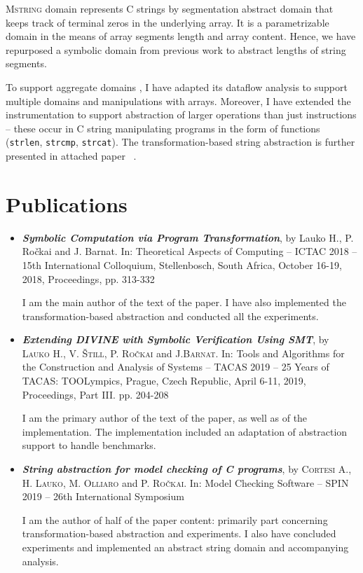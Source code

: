 \textsc{Mstring} domain represents C strings by segmentation abstract domain
that keeps track of terminal zeros in the underlying array. It is a
parametrizable domain in the means of array segments length and array
content.  Hence, we have repurposed a symbolic domain from previous work to
abstract lengths of string segments.

To support aggregate domains \lart, I have adapted its data\-flow analysis to
support multiple domains and manipulations with \llvm arrays. Moreover, I have
extended the instrumentation to support abstraction of larger operations than
just \llvm instructions -- these occur in C string manipulating programs in the
form of functions (\texttt{strlen}, \texttt{strcmp}, \texttt{strcat}). The
transformation-based string abstraction is further presented in attached paper
~\cite{Lauko2019String}.

\section{Publications}
\label{sec:publications}

\begin{itemize}

\item \textbf{\emph{Symbolic Computation via Program Transformation}}, by Lauko
H., P. Ročkai and J. Barnat.  In: Theoretical Aspects of Computing -- ICTAC 2018 --
15th International Colloquium, Stellenbosch, South Africa, October 16-19, 2018,
Proceedings, pp. 313-332~\cite{Lauko2018SymComp}

I am the main author of the text of the paper. I have also implemented the
transformation-based abstraction and conducted all the experiments.

\item \emph{\textbf{Extending \textsf{DIVINE} with Symbolic Verification Using SMT}},
by \textsc{Lauko} H., V. \textsc{Štill}, P. \textsc{Ročkai} and J.\textsc{Barnat}.
In: Tools and Algorithms for the Construction and Analysis of Systems -- TACAS 2019 --
25 Years of TACAS: TOOLympics, Prague, Czech Republic, April 6-11, 2019,
Proceedings, Part III. pp. 204-208~\cite{Lauko2019Sym}

I am the primary author of the text of the paper, as well as of the
implementation. The implementation included an adaptation of \divine
abstraction support to handle \svcomp benchmarks.

\item \textbf{\emph{String abstraction for model checking of C programs}},
by \textsc{Cortesi} A., H. \textsc{Lauko}, M. \textsc{Olliaro} and P. \textsc{Ročkai}.
        In: Model Checking Software -- SPIN 2019 -- 26th International Symposium~\cite{Lauko2019String}

I am the author of half of the paper content: primarily part concerning
transformation-based abstraction and experiments. I also have concluded
experiments and implemented an abstract string domain and accompanying
\lart analysis.

\end{itemize}

